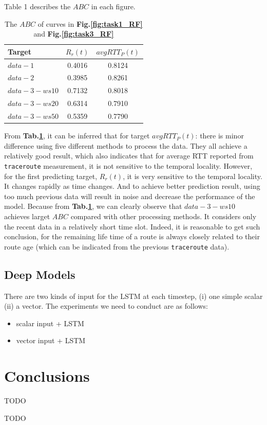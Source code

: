 \documentclass[sigconf]{acmart}
\begin{document}
Table 1 describes the $ABC$ in each figure.
\begin{table}[tbp]
	\centering  %
	\begin{tabular}{lcc} 
		\hline
		Target &$R_r(t)$ &$avgRTT_P(t)$ \\ \hline
		$data-1$ & 0.4016    &0.8124   \\        
		$data-2$ &0.3985 &0.8261 \\        
		$data-3-ws10$  &0.7132 &0.8018 \\
		$data-3-ws20$ &0.6314 &0.7910 \\
		$data-3-ws50$ &0.5359  &0.7790 \\ \hline
	\end{tabular}
	\caption{The $ABC$ of curves
		 in \textbf{Fig.\ref{fig:task1_RF}} and \textbf{Fig.\ref{fig:task3_RF}} }
	 \label{tab:result_RF}
\end{table}
From \textbf{Tab.\ref{tab:result_RF}}, it can be inferred that for target $avgRTT_P(t)$: there is minor difference using five different methods to process the data. They all achieve a relatively good result, which also indicates that for average RTT reported from \texttt{traceroute} measurement, it is not sensitive to the temporal locality. However, for the first predicting target, $R_r(t)$, it is very sensitive to the temporal locality. It changes rapidly as time changes. And to achieve better prediction result, using too much previous data will result in noise and decrease the performance of the model. Because from \textbf{Tab.\ref{tab:result_RF}}, we can clearly observe that $data-3-ws10$ achieves larget $ABC$ compared with other processing methods. It considers only the recent data in a relatively short time slot. Indeed, it is reasonable to get such conclusion, for the remaining life time of a route is always closely related to their route age (which can be indicated from the previous \texttt{traceroute} data).
\subsection{Deep Models}

There are two kinds of input for the LSTM at each timestep, (i) one simple scalar (ii) a vector.
The experiments we need to conduct are as follows:
\begin{itemize}
\item scalar input + LSTM
\item vector input + LSTM
\end{itemize}

\section{Conclusions}
TODO

\begin{acks}
TODO
\end{acks}




 
\end{document}
